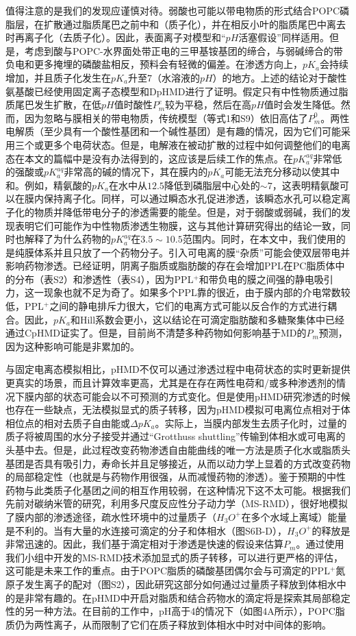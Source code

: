 \documentclass[journal=,manuscript=artical,email=false]{achemso}
\begin{document}
值得注意的是我们的发现应谨慎对待。弱酸也可能以带电物质的形式结合POPC磷脂层，在扩散通过脂质尾巴之前中和（质子化），并在相反小叶的脂质尾巴中离去时再离子化（去质子化）。因此，表面离子对模型和“$pH$活塞假设”同样适用。但是，考虑到酸与POPC-水界面处带正电的三甲基铵基团的缔合，与弱碱缔合的带负电和更多掩埋的磷酸盐相反，预料会有轻微的偏差。在渗透方向上，$pK_a$会持续增加，并且质子化发生在$pK_a$升至7（水溶液的$pH$）的地方。上述的结论对于酸性氨基酸已经使用固定离子态模型和DpHMD进行了证明。假定只有中性物质通过脂质尾巴发生扩散，在低$pH$值时酸性$P^e_m$较为平稳，然后在高$pH$值时会发生降低。然而，因为忽略与膜相关的带电物质，传统模型（等式1和S9）依旧高估了$P^0_m$。两性电解质（至少具有一个酸性基团和一个碱性基团）是有趣的情况，因为它们可能采用三个或更多个电荷状态。但是，电解液在被动扩散的过程中如何调整他们的电离态在本文的篇幅中是没有办法得到的，这应该是后续工作的焦点。在$pK^{aq}_a$非常低的强酸或$pK^{aq}_a$非常高的碱的情况下，其在膜内的$pK_a$可能无法充分移动以使其中和。例如，精氨酸的$pK_a$在水中从$12.5$降低到磷脂层中心处的$\sim 7$，这表明精氨酸可以在膜内保持离子化。同样，可以通过瞬态水孔促进渗透，该瞬态水孔可以稳定离子化的物质并降低带电分子的渗透需要的能垒。但是，对于弱酸或弱碱，我们的发现表明它们可能作为中性物质渗透生物膜，这与其他计算研究得出的结论一致，同时也解释了为什么药物的$pK^{aq}_a$在$3.5\sim 10.5$范围内。同时，在本文中，我们使用的是纯膜体系并且只放了一个药物分子。引入可电离的膜“杂质”可能会使双层带电并影响药物渗透。已经证明，阴离子脂质或脂肪酸的存在会增加PPL在PC脂质体中的分布（表S2）和渗透性（表S4），因为PPL$^{+}$和带负电的膜之间强的静电吸引力，这一现象也就不足为奇了。如果多个PPL靠的很近，由于膜内部的介电常数较低，PPL$^{+}$之间的静电排斥力很大，它们的电离方式可能以反合作的方式进行耦合。因此，$pK_a$和Hill系数会更小，这以结论在可滴定脂肪酸和多糖聚集体中已经通过CpHMD证实了。但是，目前尚不清楚多种药物如何影响基于MD的$P_m$预测，因为这种影响可能是非累加的。

与固定电离态模拟相比，pHMD不仅可以通过渗透过程中电荷状态的实时更新提供更真实的场景，而且计算效率更高，尤其是在存在两性电荷和/或多种渗透剂的情况下膜内部的状态可能会以不可预测的方式变化。但是使用pHMD研究渗透的时候也存在一些缺点，无法模拟显式的质子转移，因为pHMD模拟可电离位点相对于体相位点的相对去质子自由能或$\Delta pK_a$。实际上，当膜内部发生去质子化时，过量的质子将被周围的水分子接受并通过“Grotthuss shuttling”传输到体相水或可电离的头基中去。但是，此过程改变药物渗透自由能曲线的唯一方法是质子化水或脂质头基团是否具有吸引力，寿命长并且足够接近，从而以动力学上显着的方式改变药物的局部稳定性（也就是与药物作用很强，从而减慢药物的渗透）。鉴于预期的中性药物与此类质子化基团之间的相互作用较弱，在这种情况下这不太可能。根据我们先前对碳纳米管的研究，利用多尺度反应性分子动力学（MS-RMD），很好地模拟了膜内部的渗透途径，疏水性环境中的过量质子（$H_3O^+$在多个水域上离域）能量是不利的。当有大量的水连接可滴定的分子和体相水（图S6B-D），$H_3O^+$的释放是非常迅速的。因此，我们基于滴定相对于渗透是快速的假设来估算$P_m$。通过使用我们小组中开发的MS-RMD技术添加显式的质子转移，可以进行更严格的评估，这可能是未来工作的重点。由于POPC脂质的磷酸基团偶尔会与可滴定的PPL$^{+}$氮原子发生离子的配对（图S2），因此研究这部分如何通过过量质子释放到体相水中的是非常有趣的。在pHMD中开启对脂质和结合药物水的滴定将是探索其局部稳定性的另一种方法。在目前的工作中，pH高于4的情况下（如图4A所示），POPC脂质仍为两性离子，从而限制了它们在质子释放到体相水中时对中间体的影响。
\end{document}
